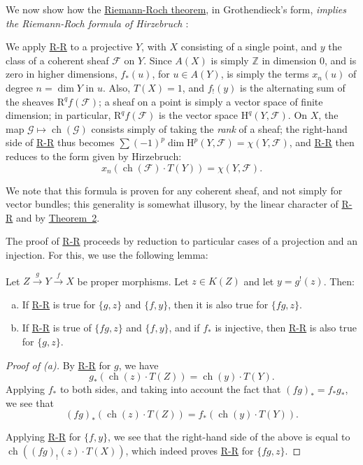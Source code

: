 \documentclass{article}
\theoremstyle{plain}
\newenvironment{lemma}[1]
    {\renewcommand\theinnerlemma{#1}\innerlemma}
    {\endinnerlemma}
\theoremstyle{definition}
\newcommand{\scr}[1]{{\mathscr{#1}}}
\newcommand{\HH}{\mathrm{H}}
\newcommand{\RR}{\mathrm{R}}
\DeclareMathOperator{\ch}{ch}
\newcommand{\oldpage}[1]{\marginpar{\footnotesize$\Big\vert$ \textit{p.~#1}}}
\begin{document}
We now show how the \hyperref[theoremriemannroch]{Riemann-Roch theorem}, in Grothendieck's form, \emph{implies the Riemann-Roch formula of Hirzebruch \cite{9}}:

We apply \hyperref[theoremriemannroch]{R-R} to a projective $Y$, with $X$ consisting of a single point, and $y$ the class of a coherent sheaf $\scr{F}$ on $Y$.
Since $A(X)$ is simply $\mathbb{Z}$ in dimension $0$, and is zero in higher dimensions, $f_*(u)$, for $u\in A(Y)$, is simply the terms $x_n(u)$ of degree $n=\dim Y$ in $u$.
Also, $T(X)=1$, and $f_!(y)$ is the alternating sum of the sheaves $\RR^qf(\scr{F})$;
a sheaf on a point is simply a vector space of finite dimension;
in particular, $\RR^qf(\scr{F})$ is the vector space $\HH^q(Y,\scr{F})$.
On $X$, the map $\scr{G}\mapsto\ch(\scr{G})$ consists simply of taking the \emph{rank} of a sheaf;
the right-hand side of \hyperref[theoremriemannroch]{R-R} thus becomes $\sum(-1)^p\dim\HH^p(Y,\scr{F}) = \chi(Y,\scr{F})$, and \hyperref[theoremriemannroch]{R-R} then reduces to the form given by Hirzebruch:
\[
  x_n(\ch(\scr{F})\cdot T(Y)) = \chi(Y,\scr{F}).
\]

We note that this formula is proven for any coherent sheaf, and not simply for vector bundles;
this generality is somewhat illusory, by the linear character of \hyperref[theoremriemannroch]{R-R} and by \hyperref[theorem2]{Theorem~2}.

The proof of \hyperref[theoremriemannroch]{R-R} proceeds by reduction to particular cases of a projection and an injection.
For this, we use the following lemma:

\begin{lemma}{15}
\label{lemma15}
  Let $Z\xrightarrow{g}Y\xrightarrow{f}X$ be proper morphisms.
  Let $z\in K(Z)$ and let $y=g^!(z)$. Then:
  \begin{enumerate}[(a)]
    \item If \hyperref[theoremriemannroch]{R-R} is true for $\{g,z\}$ and $\{f,y\}$, then it is also true for $\{fg,z\}$.
    \item If \hyperref[theoremriemannroch]{R-R} is true of $\{fg,z\}$ and $\{f,y\}$, and if $f_*$ is injective, then \hyperref[theoremriemannroch]{R-R} is also true for $\{g,z\}$.
  \end{enumerate}
\end{lemma}

\begin{proof}[Proof of (a)]
  By \hyperref[theoremriemannroch]{R-R} for $g$, we have
  \[
    g_*(\ch(z)\cdot T(Z)) = \ch(y)\cdot T(Y).
  \]
  \oldpage{114}
  Applying $f_*$ to both sides, and taking into account the fact that $(fg)_*=f_*g_*$, we see that
  \[
    (fg)_*(\ch(z)\cdot T(Z)) = f_*(\ch(y)\cdot T(Y)).
  \]

  Applying \hyperref[theoremriemannroch]{R-R} for $\{f,y\}$, we see that the right-hand side of the above is equal to $\ch((fg)_!(z)\cdot T(X))$, which indeed proves \hyperref[theoremriemannroch]{R-R} for $\{fg,z\}$.
\end{proof}
\end{document}
